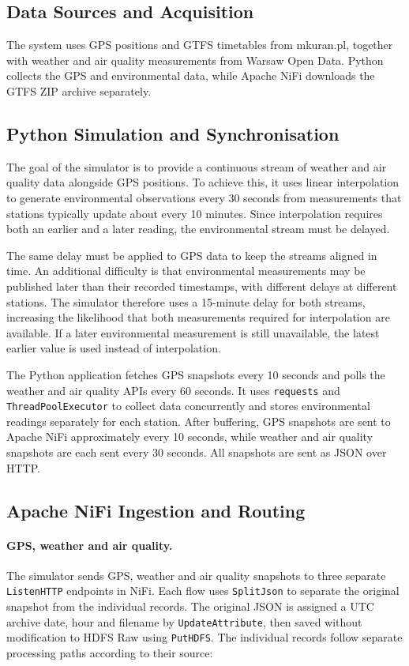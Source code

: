 \documentclass[11pt]{article}
\begin{document}
\subsection{Data Sources and Acquisition}

The system uses GPS positions and GTFS timetables from mkuran.pl, together with weather and air quality measurements from Warsaw Open Data. Python collects the GPS and environmental data, while Apache NiFi downloads the GTFS ZIP archive separately.

\subsection{Python Simulation and Synchronisation}

The goal of the simulator is to provide a continuous stream of weather and air quality data alongside GPS positions. To achieve this, it uses linear interpolation to generate environmental observations every 30 seconds from measurements that stations typically update about every 10 minutes. Since interpolation requires both an earlier and a later reading, the environmental stream must be delayed.

The same delay must be applied to GPS data to keep the streams aligned in time. An additional difficulty is that environmental measurements may be published later than their recorded timestamps, with different delays at different stations. The simulator therefore uses a 15-minute delay for both streams, increasing the likelihood that both measurements required for interpolation are available. If a later environmental measurement is still unavailable, the latest earlier value is used instead of interpolation.

The Python application fetches GPS snapshots every 10 seconds and polls the weather and air quality APIs every 60 seconds. It uses \texttt{requests} and \texttt{ThreadPoolExecutor} to collect data concurrently and stores environmental readings separately for each station. After buffering, GPS snapshots are sent to Apache NiFi approximately every 10 seconds, while weather and air quality snapshots are each sent every 30 seconds. All snapshots are sent as JSON over HTTP.

\subsection{Apache NiFi Ingestion and Routing}

\paragraph{GPS, weather and air quality.}
The simulator sends GPS, weather and air quality snapshots to three separate \texttt{ListenHTTP} endpoints in NiFi. Each flow uses \texttt{SplitJson} to separate the original snapshot from the individual records. The original JSON is assigned a UTC archive date, hour and filename by \texttt{UpdateAttribute}, then saved without modification to HDFS Raw using \texttt{PutHDFS}. The individual records follow separate processing paths according to their source:
\end{document}
